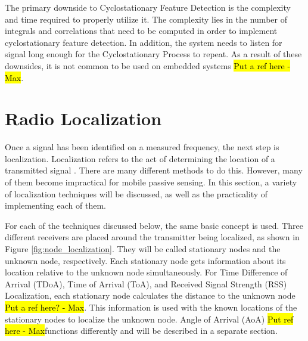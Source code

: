 The primary downside to Cyclostationary Feature Detection is the complexity and time required to properly utilize it. The complexity lies in the number of integrals and correlations that need to be computed in order to implement cyclostationary feature detection. In addition, the system needs to listen for signal long enough for the Cyclostationary Process to repeat. As a result of these downsides, it is not common to be used on embedded systems \hl{Put a ref here - Max}. \par


\section{Radio Localization} \label{back:radio_loc}
Once a signal has been identified on a measured frequency, the next step is localization. Localization refers to the act of determining the location of a transmitted signal \cite{local_conf}. There are many different methods to do this. However, many of them become impractical for mobile passive sensing. In this section, a variety of localization techniques will be discussed, as well as the practicality of implementing each of them.\par
For each of the techniques discussed below, the same basic concept is used. Three different receivers are placed around the transmitter being localized, as shown in Figure \ref{fig:node_localization}.  They will be called stationary nodes and the unknown node, respectively. Each stationary node gets information about its location relative to the unknown node simultaneously. For Time Difference of Arrival (TDoA), Time of Arrival (ToA), and Received Signal Strength (RSS) Localization, each stationary node calculates the distance to the unknown node \hl{Put a ref here? - Max}. This information is used with the known locations of the stationary nodes to localize the unknown node. Angle of Arrival (AoA) \hl{Put ref here - Max}functions differently and will be described in a separate section. \par

